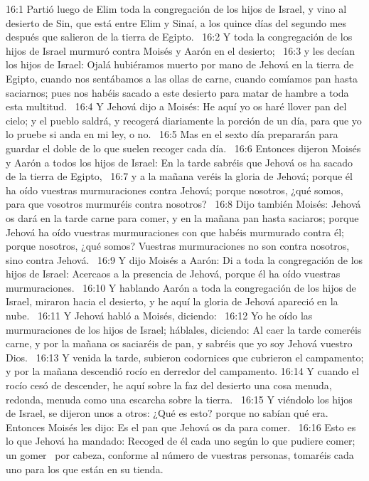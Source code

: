 16:1 Partió luego de Elim toda la congregación de los hijos de Israel, y vino al desierto de Sin, que está entre Elim y Sinaí, a los quince días del segundo mes después que salieron de la tierra de Egipto.  
16:2 Y toda la congregación de los hijos de Israel murmuró contra Moisés y Aarón en el desierto;  
16:3 y les decían los hijos de Israel: Ojalá hubiéramos muerto por mano de Jehová en la tierra de Egipto, cuando nos sentábamos a las ollas de carne, cuando comíamos pan hasta saciarnos; pues nos habéis sacado a este desierto para matar de hambre a toda esta multitud.  
16:4 Y Jehová dijo a Moisés: He aquí yo os haré llover pan del cielo; y el pueblo saldrá, y recogerá diariamente la porción de un día, para que yo lo pruebe si anda en mi ley, o no.  
16:5 Mas en el sexto día prepararán para guardar el doble de lo que suelen recoger cada día.  
16:6 Entonces dijeron Moisés y Aarón a todos los hijos de Israel: En la tarde sabréis que Jehová os ha sacado de la tierra de Egipto,  
16:7 y a la mañana veréis la gloria de Jehová; porque él ha oído vuestras murmuraciones contra Jehová; porque nosotros, ¿qué somos, para que vosotros murmuréis contra nosotros?  
16:8 Dijo también Moisés: Jehová os dará en la tarde carne para comer, y en la mañana pan hasta saciaros; porque Jehová ha oído vuestras murmuraciones con que habéis murmurado contra él; porque nosotros, ¿qué somos? Vuestras murmuraciones no son contra nosotros, sino contra Jehová.  
16:9 Y dijo Moisés a Aarón: Di a toda la congregación de los hijos de Israel: Acercaos a la presencia de Jehová, porque él ha oído vuestras murmuraciones.  
16:10 Y hablando Aarón a toda la congregación de los hijos de Israel, miraron hacia el desierto, y he aquí la gloria de Jehová apareció en la nube.  
16:11 Y Jehová habló a Moisés, diciendo:  
16:12 Yo he oído las murmuraciones de los hijos de Israel; háblales, diciendo: Al caer la tarde comeréis carne, y por la mañana os saciaréis de pan, y sabréis que yo soy Jehová vuestro Dios.  
16:13 Y venida la tarde, subieron codornices que cubrieron el campamento; y por la mañana descendió rocío en derredor del campamento. 
16:14 Y cuando el rocío cesó de descender, he aquí sobre la faz del desierto una cosa menuda, redonda, menuda como una escarcha sobre la tierra.  
16:15 Y viéndolo los hijos de Israel, se dijeron unos a otros: ¿Qué es esto? porque no sabían qué era. Entonces Moisés les dijo: Es el pan que Jehová os da para comer.  
16:16 Esto es lo que Jehová ha mandado: Recoged de él cada uno según lo que pudiere comer; un gomer  por cabeza, conforme al número de vuestras personas, tomaréis cada uno para los que están en su tienda.  

